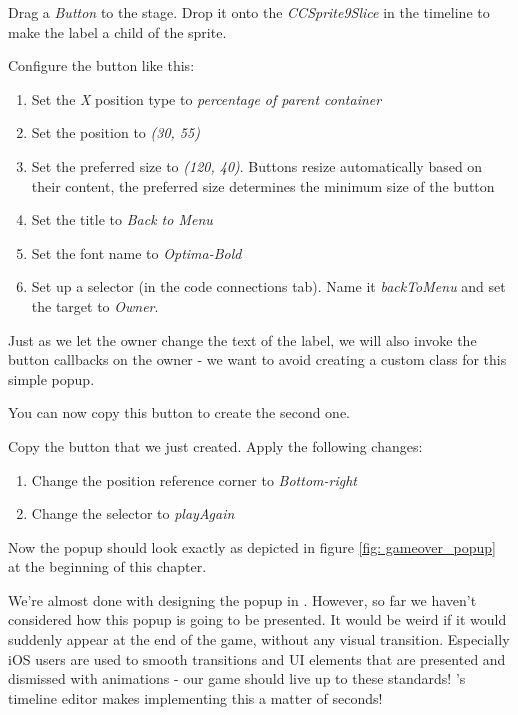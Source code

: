 \begin{leftbar}
Drag a \textit{Button} to the stage. Drop it onto the
\textit{CCSprite9Slice} in the timeline to make the label a child of the sprite.

Configure the button like this:
\begin{enumerate}
  \item Set the \textit{X} position type to \textit{percentage of parent
  container}
  \item Set the position to \textit{(30, 55)}
  \item Set the preferred size to \textit{(120, 40)}. Buttons resize
  automatically based on their content, the preferred size determines the
  minimum size of the button
  \item Set the title to \textit{Back to Menu}
  \item Set the font name to \textit{Optima-Bold}
  \item Set up a selector (in the code connections tab). Name it
  \textit{backToMenu} and set the target to \textit{Owner}.
\end{enumerate}
\end{leftbar}

Just as we let the owner change the text of the label, we will also invoke the
button callbacks on the owner - we want to avoid creating a custom class for
this simple popup.

You can now copy this button to create the second one.
\begin{leftbar}
Copy the button that we just created. Apply the following changes:
\begin{enumerate}
  \item Change the position reference corner to \textit{Bottom-right}
  \item Change the selector to \textit{playAgain} 
\end{enumerate}
\end{leftbar}

Now the popup should look exactly as depicted in figure \ref{fig:
gameover_popup} at the beginning of this chapter.

We're almost done with designing the popup in \SB{}. However, so far we haven't
considered how this popup is going to be presented. It would be weird if it
would suddenly appear at the end of the game, without any visual transition.
Especially iOS users are used to smooth transitions and UI elements that are
presented and dismissed with animations - our game should live up to these
standards! \SB{}'s timeline editor makes implementing this a matter of seconds!

